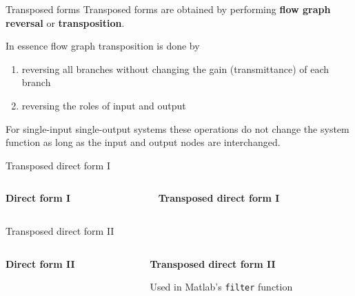 \documentclass[10pt]{beamer}
\begin{document}
\begin{frame}{Transposed forms}
	Transposed forms are obtained by performing \textbf{flow graph reversal} or \textbf{transposition}.

	In essence flow graph transposition is done by 
	\begin{enumerate}
		\item reversing all branches without changing the gain (transmittance) of each branch
		\item reversing the roles of input and output
	\end{enumerate}

	 For single-input single-output systems these operations do not change the system function as long as the input and output nodes are interchanged. 
\end{frame}

\begin{frame}{Transposed direct form I}
	\begin{columns}
		\begin{column}{0.5\textwidth}
			\textbf{Direct form I}
			\begin{center}
				\resizebox{\textwidth}{!}{}
			\end{center}
		\end{column}
		\begin{column}{0.5\textwidth}
			\textbf{Transposed direct form I}
			\begin{center}
				\resizebox{\textwidth}{!}{}
			\end{center}
		\end{column}
	\end{columns}
\end{frame}


\begin{frame}{Transposed direct form II}
	\begin{columns}[t]
		\begin{column}{0.5\textwidth}
			\textbf{Direct form II}
			\begin{center}
				\resizebox{\textwidth}{!}{}
			\end{center}
		\end{column}
		\begin{column}{0.5\textwidth}
			\textbf{Transposed direct form II}
			\begin{center}
				\resizebox{\textwidth}{!}{}
			\end{center}
			\pause
			Used in Matlab's \texttt{filter} function
		\end{column}
	\end{columns}
\end{frame}
\end{document}

